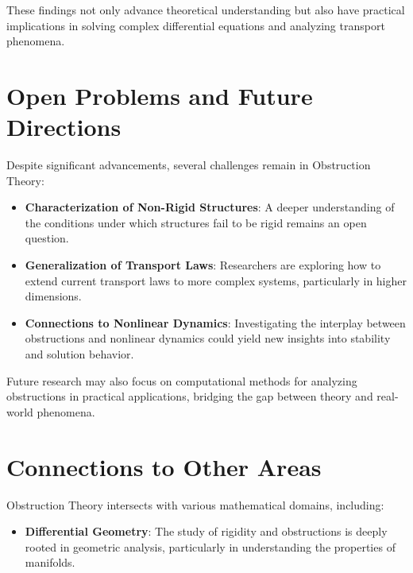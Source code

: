 \documentclass[11pt,a4paper]{article}
\begin{document}
These findings not only advance theoretical understanding but also have practical implications in solving complex differential equations and analyzing transport phenomena.

\section{Open Problems and Future Directions}

Despite significant advancements, several challenges remain in Obstruction Theory:

\begin{itemize}
\item \textbf{Characterization of Non-Rigid Structures}: A deeper understanding of the conditions under which structures fail to be rigid remains an open question.
\end{itemize}

\begin{itemize}
\item \textbf{Generalization of Transport Laws}: Researchers are exploring how to extend current transport laws to more complex systems, particularly in higher dimensions.
\end{itemize}

\begin{itemize}
\item \textbf{Connections to Nonlinear Dynamics}: Investigating the interplay between obstructions and nonlinear dynamics could yield new insights into stability and solution behavior.
\end{itemize}

Future research may also focus on computational methods for analyzing obstructions in practical applications, bridging the gap between theory and real-world phenomena.

\section{Connections to Other Areas}

Obstruction Theory intersects with various mathematical domains, including:

\begin{itemize}
\item \textbf{Differential Geometry}: The study of rigidity and obstructions is deeply rooted in geometric analysis, particularly in understanding the properties of manifolds.
\end{itemize}
\end{document}
